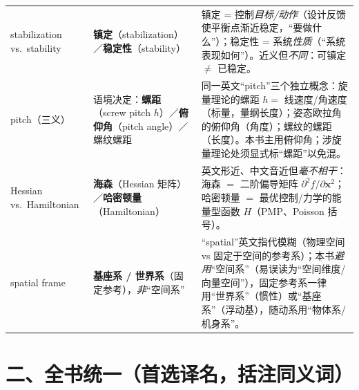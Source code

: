 \begin{center}
\begin{longtable}{p{} p{} p{}}
stabilization vs.\ stability
  & \textbf{镇定}（stabilization）／\textbf{稳定性}（stability）
  & 镇定 = 控制\emph{目标/动作}（设计反馈使平衡点渐近稳定，“要做什么”）；稳定性 = 系统\emph{性质}（“系统表现如何”）。近义但\emph{不同}：可镇定 $\ne$ 已稳定。\\
pitch（三义）
  & 语境决定：\textbf{螺距}（screw pitch $h$）／\textbf{俯仰角}（pitch angle）／螺纹螺距
  & 同一英文“pitch”三个独立概念：旋量理论的螺距 $h=$ 线速度/角速度（标量，量纲长度）；姿态欧拉角的俯仰角（角度）；螺纹的螺距（长度）。本书主用俯仰角；涉旋量理论处须显式标“螺距”以免混。\\
Hessian vs.\ Hamiltonian
  & \textbf{海森}（Hessian 矩阵）／\textbf{哈密顿量}（Hamiltonian）
  & 英文形近、中文音近但\emph{毫不相干}：海森 $=$ 二阶偏导矩阵 $\partial^2 f/\partial\mathbf{x}^2$；哈密顿量 $=$ 最优控制/力学的能量型函数 $H$（PMP、Poisson 括号）。\\
spatial frame
  & \textbf{基座系 / 世界系}（固定参考），\emph{非}“空间系”
  & “spatial”英文指代模糊（物理空间 vs 固定于空间的参考系）；本书\emph{避用}“空间系”（易误读为“空间维度/向量空间”），固定参考系一律用“世界系”（惯性）或“基座系”（浮动基），随动系用“物体系/机身系”。\\
\end{longtable}
\end{center}

\section*{二、全书统一（首选译名，括注同义词）}

